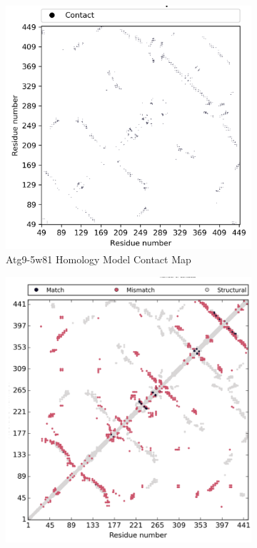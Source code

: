 \begin{figure}[htb]
    \centering %
\begin{subfigure}{0.5\textwidth}
  \includegraphics[width=\linewidth]{Modelling of Atg9/atg9_hmo_5w81_cmap.png}
  \caption{Atg9-5w81 Homology Model Contact Map}
  \label{fig:0}
  \end{subfigure}\hfil %
  \begin{subfigure}{0.45\textwidth}
  \includegraphics[width=\linewidth]{Modelling of Atg9/5w81_respre_super.png}

\end{subfigure}
\end{figure}
